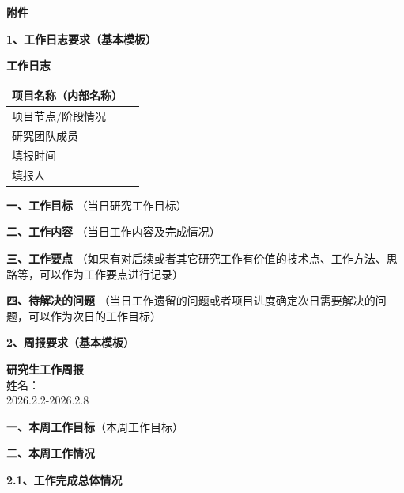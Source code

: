 \documentclass[a4paper,zihao=false]{ctexart}
\begin{document}
\fontsize{14pt}{17.5pt}\selectfont

\noindent\textbf{附件}

\noindent\textbf{1、工作日志要求（基本模板）}
\begin{center}
    \textbf{\fontsize{20pt}{25pt}\selectfont 工作日志}
\end{center}

\begin{table}[h]
\fontsize{14pt}{17.5pt}\selectfont
\renewcommand{\arraystretch}{1.5}
\begin{tabularx}{\textwidth}{|l|X|}
\hline
项目名称（内部名称） & \\ \hline
项目节点/阶段情况 & \\ \hline
研究团队成员 & \\ \hline
填报时间 & \\ \hline
填报人 & \\ \hline
\end{tabularx}
\end{table}

\noindent\textbf{一、工作目标} （当日研究工作目标）

\vspace{2em}
\noindent\textbf{二、工作内容} （当日工作内容及完成情况）

\vspace{2em}
\noindent\textbf{三、工作要点} （如果有对后续或者其它研究工作有价值的技术点、工作方法、思路等，可以作为工作要点进行记录）

\vspace{2em}
\noindent\textbf{四、待解决的问题} （当日工作遗留的问题或者项目进度确定次日需要解决的问题，可以作为次日的工作目标）





\clearpage
\noindent\textbf{2、周报要求（基本模板）}
\begin{center}
    \textbf{\fontsize{20pt}{25pt}\selectfont 研究生工作周报 }\\
    \vspace{0.5em}
    姓名：\\
    \vspace{0.5em}
    2026.2.2-2026.2.8
\end{center}

\noindent\textbf{一、本周工作目标}（本周工作目标）

\vspace{2em}
\noindent\textbf{二、本周工作情况}

\noindent\textbf{2.1、工作完成总体情况}
\end{document}

